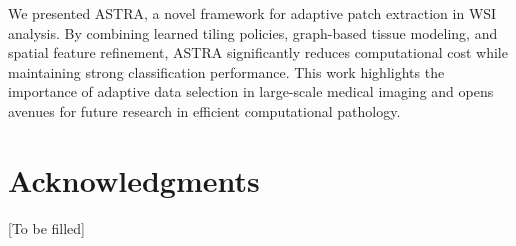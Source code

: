 \documentclass[runningheads]{llncs}
\begin{document}
\label{sec:conclusion}

We presented ASTRA, a novel framework for adaptive patch extraction in WSI analysis. By combining learned tiling policies, graph-based tissue modeling, and spatial feature refinement, ASTRA significantly reduces computational cost while maintaining strong classification performance. This work highlights the importance of adaptive data selection in large-scale medical imaging and opens avenues for future research in efficient computational pathology.

\section*{Acknowledgments}

[To be filled]



\end{document}
